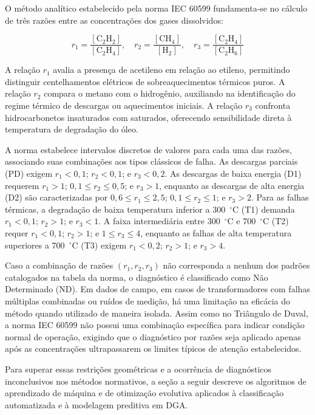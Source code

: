 O método analítico estabelecido pela norma IEC 60599 \cite{iec60599_2022} fundamenta-se no cálculo de três razões entre as concentrações dos gases dissolvidos:

\begin{equation}\label{eq:razoes_iec}
r_1 = \frac{[\text{C}_2\text{H}_2]}{[\text{C}_2\text{H}_4]}, \quad
r_2 = \frac{[\text{CH}_4]}{[\text{H}_2]}, \quad
r_3 = \frac{[\text{C}_2\text{H}_4]}{[\text{C}_2\text{H}_6]}
\end{equation}

A relação $r_1$ avalia a presença de acetileno em relação ao etileno, permitindo distinguir centelhamentos elétricos de sobreaquecimentos térmicos puros. A relação $r_2$ compara o metano com o hidrogênio, auxiliando na identificação do regime térmico de descargas ou aquecimentos iniciais. A relação $r_3$ confronta hidrocarbonetos insaturados com saturados, oferecendo sensibilidade direta à temperatura de degradação do óleo.

A norma estabelece intervalos discretos de valores para cada uma das razões, associando suas combinações aos tipos clássicos de falha. As descargas parciais (PD) exigem $r_1 < 0,1$; $r_2 < 0,1$; e $r_3 < 0,2$. As descargas de baixa energia (D1) requerem $r_1 > 1$; $0,1 \le r_2 \le 0,5$; e $r_3 > 1$, enquanto as descargas de alta energia (D2) são caracterizadas por $0,6 \le r_1 \le 2,5$; $0,1 \le r_2 \le 1$; e $r_3 > 2$. Para as falhas térmicas, a degradação de baixa temperatura inferior a 300~$^\circ\text{C}$ (T1) demanda $r_1 < 0,1$; $r_2 > 1$; e $r_3 < 1$. A faixa intermediária entre 300~$^\circ\text{C}$ e 700~$^\circ\text{C}$ (T2) requer $r_1 < 0,1$; $r_2 > 1$; e $1 \le r_3 \le 4$, enquanto as falhas de alta temperatura superiores a 700~$^\circ\text{C}$ (T3) exigem $r_1 < 0,2$; $r_2 > 1$; e $r_3 > 4$.

Caso a combinação de razões $(r_1, r_2, r_3)$ não corresponda a nenhum dos padrões catalogados na tabela da norma, o diagnóstico é classificado como Não Determinado (ND). Em dados de campo, em casos de transformadores com falhas múltiplas combinadas ou ruídos de medição, há uma limitação na eficácia do método quando utilizado de maneira isolada. Assim como no Triângulo de Duval, a norma IEC 60599 não possui uma combinação específica para indicar condição normal de operação, exigindo que o diagnóstico por razões seja aplicado apenas após as concentrações ultrapassarem os limites típicos de atenção estabelecidos.

Para superar essas restrições geométricas e a ocorrência de diagnósticos inconclusivos nos métodos normativos, a seção a seguir descreve os algoritmos de aprendizado de máquina e de otimização evolutiva aplicados à classificação automatizada e à modelagem preditiva em DGA.


